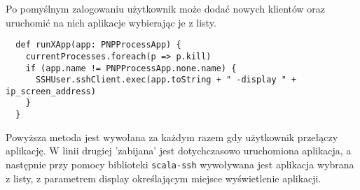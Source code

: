 Po pomyślnym zalogowaniu użytkownik może dodać nowych klientów oraz uruchomić na nich aplikacje wybierając je z listy.

\begin{lstlisting}
  def runXApp(app: PNPProcessApp) {
    currentProcesses.foreach(p => p.kill)
    if (app.name != PNPProcessApp.none.name) {
      SSHUser.sshClient.exec(app.toString + " -display " + ip_screen_address)
    }
  }
\end{lstlisting}

Powyższa metoda jest wywołana za każdym razem gdy użytkownik przełączy aplikację. W linii drugiej 'zabijana' jest dotychczasowo uruchomiona aplikacja, a następnie przy pomocy biblioteki \lstinline{scala-ssh} wywoływana jest aplikacja wybrana z listy, z parametrem display określającym miejsce wyświetlenie aplikacji.



